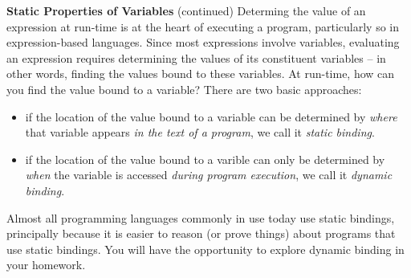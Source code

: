 \begin{minipage}[t]{\sw}
\slidenumber
\LARGE
{\bf Static Properties of Variables} (continued)\exx
Determing the value of an expression at run-time is at the heart
of executing a program, particularly so in expression-based languages.
Since most expressions involve variables,
evaluating an expression requires determining the values
of its constituent variables --
in other words, finding the values bound to these variables.\exx
At run-time, how can you find the value bound to a variable?
There are two basic approaches:
\begin{itemize}
\item
if the location of the value bound to a variable can be determined
by {\em where} that variable appears {\em in the text of a program},
we call it {\em static binding}.
\item
if the location of the value bound to a varible can only be determined
by {\em when} the variable is accessed {\em during program execution},
we call it {\em dynamic binding}.
\end{itemize}
Almost all programming languages commonly in use today
use static bindings,
principally because it is easier
to reason (or prove things) about programs that use static bindings.
You will have the opportunity
to explore dynamic binding in your homework.\exx
\end{minipage}
\clearpage
